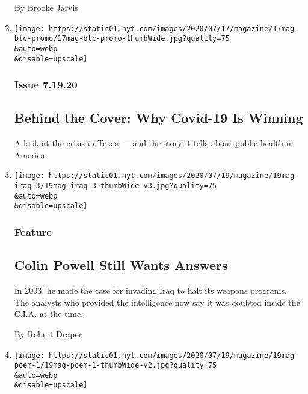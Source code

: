 \begin{enumerate}
  By Brooke Jarvis
\item
  \href{/2020/07/17/magazine/behind-the-cover-why-covid-19-is-winning.html}{}

  \texttt{[image: https://static01.nyt.com/images/2020/07/17/magazine/17mag-btc-promo/17mag-btc-promo-thumbWide.jpg?quality=75\\\&auto=webp\\\&disable=upscale]}

  \hypertarget{issue-71920}{%
  \subsubsection{Issue 7.19.20}\label{issue-71920}}

  \hypertarget{behind-the-cover-why-covid-19-is-winning}{%
  \subsection{Behind the Cover: Why Covid-19 Is
  Winning}\label{behind-the-cover-why-covid-19-is-winning}}

  A look at the crisis in Texas --- and the story it tells about public
  health in America.
\item
  \href{/2020/07/16/magazine/colin-powell-iraq-war.html}{}

  \texttt{[image: https://static01.nyt.com/images/2020/07/19/magazine/19mag-iraq-3/19mag-iraq-3-thumbWide-v3.jpg?quality=75\\\&auto=webp\\\&disable=upscale]}

  \hypertarget{feature-3}{%
  \subsubsection{Feature}\label{feature-3}}

  \hypertarget{colin-powell-still-wants-answers}{%
  \subsection{Colin Powell Still Wants
  Answers}\label{colin-powell-still-wants-answers}}

  In 2003, he made the case for invading Iraq to halt its weapons
  programs. The analysts who provided the intelligence now say it was
  doubted inside the C.I.A. at the time.

  By Robert Draper
\item
  \href{/2020/07/16/magazine/poem-the-bodys-uncontested-need-to-devour-an-explanation.html}{}

  \texttt{[image: https://static01.nyt.com/images/2020/07/19/magazine/19mag-poem-1/19mag-poem-1-thumbWide-v2.jpg?quality=75\\\&auto=webp\\\&disable=upscale]}


\end{enumerate}

